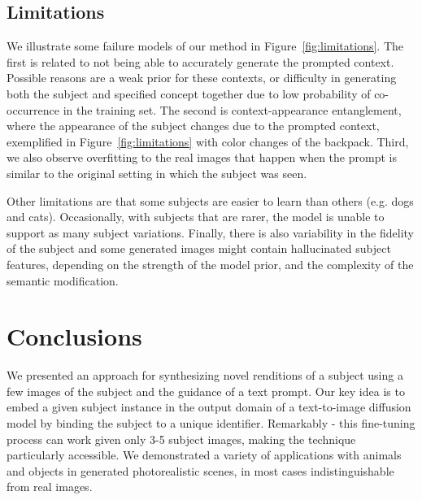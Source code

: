 \subsection{Limitations}
We illustrate some failure models of our method in Figure~\ref{fig:limitations}. The first is related to not being able to accurately generate the prompted context. Possible reasons are a weak prior for these contexts, or difficulty in generating both the subject and specified concept together due to low probability of co-occurrence in the training set. The second is context-appearance entanglement, where the appearance of the subject changes due to the prompted context, exemplified in Figure~\ref{fig:limitations} with color changes of the backpack. Third, we also observe overfitting to the real images that happen when the prompt is similar to the original setting in which the subject was seen.

Other limitations are that some subjects are easier to learn than others (e.g. dogs and cats). Occasionally, with subjects that are rarer, the model is unable to support as many subject variations. Finally, there is also variability in the fidelity of the subject and some generated images might contain hallucinated subject features, depending on the strength of the model prior, and the complexity of the semantic modification.

\section{Conclusions}
We presented an approach for synthesizing novel renditions of a subject using a few images of the subject and the guidance of a text prompt. Our key idea is to embed a given subject instance in the output domain of a text-to-image diffusion model by binding the subject to a unique identifier. Remarkably - this fine-tuning process can work given only 3-5 subject images, making the technique particularly accessible. We demonstrated a variety of applications with animals and objects in generated photorealistic scenes, in most cases indistinguishable from real images.


